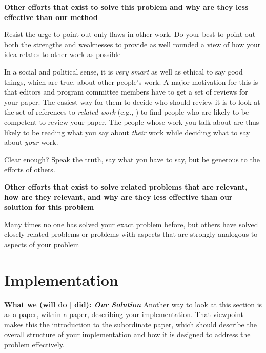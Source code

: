 \documentclass[pdf,bookmarks,colorlinks=true]{IEEEtran}
\begin{document}
\textbf{Other efforts that exist to solve this problem and why are they
less effective than our method}

Resist the urge to point out only flaws in other work. Do your best to point
out both the strengths and weaknesses to provide as well rounded a view of how
your idea relates to other work as possible

In a social and political sense, it is {\em very smart} as well as ethical to
say good things, which are true, about other people's work. A major motivation
for this is that editors and program committee members have to get a set of
reviews for your paper. The easiest way for them to decide who should review it
is to look at the set of references to {\em related work} (e.g.,
\cite{Anderson2007,Anderson2009}) to find people who are likely to be competent to
review your paper.  The people whose work you talk about are thus likely to be
reading what you say about {\em their} work while deciding what to say about
{\em your} work.

Clear enough? Speak the truth, say what you have to say, but be generous to the
efforts of others.



\textbf{Other efforts that exist to solve related problems that are
relevant, how are they relevant, and why are they less effective than our
solution for this problem}

Many times no one has solved your exact problem before, but others have solved
closely related problems or problems with aspects that are strongly analogous
to aspects of your problem


\section{Implementation}
\label{sec:Implementation}

\textbf{What we (will do $|$ did): {\em Our Solution}}
Another way to look at this section is as a paper, within a paper,
describing your implementation. That viewpoint makes this the introduction to
the subordinate paper, which should describe the overall structure of your
implementation and how it is designed to address the problem effectively.
\end{document}
